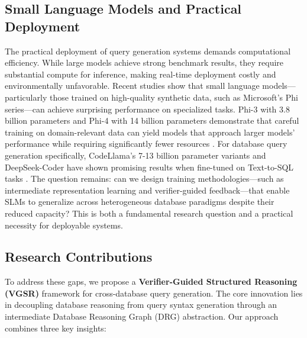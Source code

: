\documentclass[conference]{IEEEtran}
\begin{document}
\subsection{Small Language Models and Practical Deployment}

The practical deployment of query generation systems demands computational efficiency. While large models achieve strong benchmark results, they require substantial compute for inference, making real-time deployment costly and environmentally unfavorable. Recent studies show that small language models—particularly those trained on high-quality synthetic data, such as Microsoft's Phi series—can achieve surprising performance on specialized tasks. Phi-3 with 3.8 billion parameters and Phi-4 with 14 billion parameters demonstrate that careful training on domain-relevant data can yield models that approach larger models' performance while requiring significantly fewer resources \cite{b19, b20}. For database query generation specifically, CodeLlama's 7-13 billion parameter variants and DeepSeek-Coder have shown promising results when fine-tuned on Text-to-SQL tasks \cite{b21}. The question remains: can we design training methodologies—such as intermediate representation learning and verifier-guided feedback—that enable SLMs to generalize across heterogeneous database paradigms despite their reduced capacity? This is both a fundamental research question and a practical necessity for deployable systems.

\subsection{Research Contributions}

To address these gaps, we propose a \textbf{Verifier-Guided Structured Reasoning (VGSR)} framework for cross-database query generation. The core innovation lies in decoupling database reasoning from query syntax generation through an intermediate Database Reasoning Graph (DRG) abstraction. Our approach combines three key insights:
\end{document}
